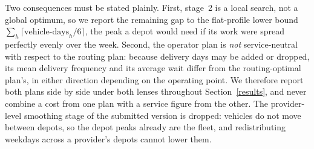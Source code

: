 \documentclass[preprint,12pt,authoryear]{elsarticle}
\begin{document}
Two consequences must be stated plainly. First, stage~2 is a local search, not a global optimum, so we report the remaining gap to the flat-profile lower bound $\sum_h \lceil \text{vehicle-days}_h / 6 \rceil$, the peak a depot would need if its work were spread perfectly evenly over the week. Second, the operator plan is \emph{not} service-neutral with respect to the routing plan: because delivery days may be added or dropped, its mean delivery frequency and its average wait differ from the routing-optimal plan's, in either direction depending on the operating point. We therefore report both plans side by side under both lenses throughout Section~\ref{results}, and never combine a cost from one plan with a service figure from the other. The provider-level smoothing stage of the submitted version is dropped: vehicles do not move between depots, so the depot peaks already are the fleet, and redistributing weekdays across a provider's depots cannot lower them.













\end{document}

